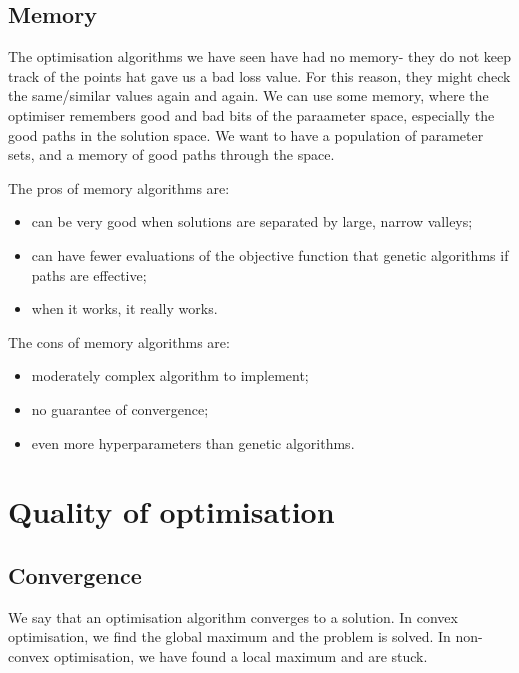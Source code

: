 \documentclass[a4paper, openany]{memoir}
\begin{document}
\subsection{Memory}
The optimisation algorithms we have seen have had no memory- they do not keep track of the points hat gave us a bad loss value. For this reason, they might check the same/similar values again and again. We can use some memory, where the optimiser remembers good and bad bits of the paraameter space, especially the good paths in the solution space. We want to have a population of parameter sets, and a memory of good paths through the space.

The pros of memory algorithms are:
\begin{itemize}
    \item can be very good when solutions are separated by large, narrow valleys;
    \item can have fewer evaluations of the objective function that genetic algorithms if paths are effective;
    \item when it works, it really works.
\end{itemize}
The cons of memory algorithms are:
\begin{itemize}
    \item moderately complex algorithm to implement;
    \item no guarantee of convergence;
    \item even more hyperparameters than genetic algorithms.
\end{itemize}

\section{Quality of optimisation}
\subsection{Convergence}
We say that an optimisation algorithm converges to a solution. In convex optimisation, we find the global maximum and the problem is solved. In non-convex optimisation, we have found a local maximum and are stuck.
\end{document}
